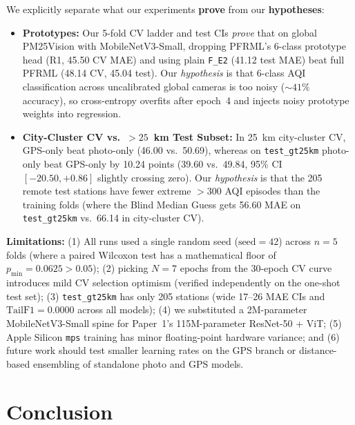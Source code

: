 \documentclass[conference]{IEEEtran}
\begin{document}
We explicitly separate what our experiments \textbf{prove} from our
\textbf{hypotheses}:
\begin{itemize}
  \item \textbf{Prototypes:} Our 5-fold CV ladder and test CIs \textit{prove}
        that on global PM25Vision with MobileNetV3-Small, dropping PFRML's
        6-class prototype head (R1, 45.50 CV MAE) and using plain \texttt{F\_E2}
        (41.12 test MAE) beat full PFRML (48.14 CV, 45.04 test). Our
        \textit{hypothesis} is that 6-class AQI classification across
        uncalibrated global cameras is too noisy ($\sim 41\%$ accuracy), so
        cross-entropy overfits after epoch~4 and injects noisy prototype weights
        into regression.
  \item \textbf{City-Cluster CV vs.\ $> 25$~km Test Subset:} In 25~km
        city-cluster CV, GPS-only beat photo-only (46.00 vs.\ 50.69), whereas on
        \texttt{test\_gt25km} photo-only beat GPS-only by 10.24 points (39.60
        vs.\ 49.84, 95\% CI $[-20.50, +0.86]$ slightly crossing zero). Our
        \textit{hypothesis} is that the 205 remote test stations have fewer
        extreme $> 300$ AQI episodes than the training folds (where the Blind
        Median Guess gets 56.60 MAE on \texttt{test\_gt25km} vs.\ 66.14 in
        city-cluster CV).
\end{itemize}

\textbf{Limitations:} (1) All runs used a single random seed
($\text{seed} = 42$) across $n = 5$ folds (where a paired Wilcoxon test has a
mathematical floor of $p_{\min} = 0.0625 > 0.05$); (2) picking $N = 7$ epochs
from the 30-epoch CV curve introduces mild CV selection optimism (verified
independently on the one-shot test set); (3) \texttt{test\_gt25km} has only 205
stations (wide 17--26 MAE CIs and $\text{TailF1} = 0.0000$ across all models);
(4) we substituted a 2M-parameter MobileNetV3-Small spine for Paper~1's
115M-parameter ResNet-50 + ViT; (5) Apple Silicon \texttt{mps} training has
minor floating-point hardware variance; and (6) future work should test smaller
learning rates on the GPS branch or distance-based ensembling of standalone
photo and GPS models.

\section{Conclusion}
\label{sec:conclusion}
\end{document}
